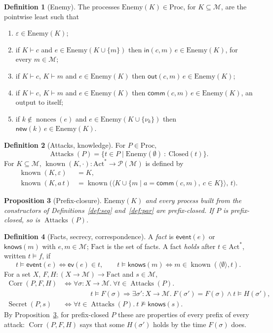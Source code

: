 \documentclass[11pt]{article}
\theoremstyle{definition}
\newtheorem{definition}{Definition}[section]
\theoremstyle{plain}
\newtheorem{proposition}[definition]{Proposition}
\theoremstyle{remark}
\newcommand{\Act}{\mathrm{Act}}
\newcommand{\Proc}{\mathrm{Proc}}
\newcommand{\known}{\operatorname{known}}
\newcommand{\Fact}{\mathrm{Fact}}
\newcommand{\Closed}{\mathrm{Closed}}
\newcommand{\nonces}{\operatorname{nonces}}
\newcommand{\Enemy}{\mathrm{Enemy}}
\newcommand{\Attacks}{\operatorname{Attacks}}
\newcommand{\Secret}{\operatorname{Secret}}
\newcommand{\Corr}{\operatorname{Corr}}
\begin{document}
\begin{definition}[Enemy]
The processes $\Enemy(K)\in\Proc$, for $K\subseteq\mathcal{M}$, are the pointwise least such that
\begin{enumerate}
\item $\varepsilon\in\Enemy(K)$;
\item if $K\vdash c$ and $e\in\Enemy(K\cup\{m\})$ then $\mathsf{in}(c,m)\,e\in\Enemy(K)$, for every $m\in\mathcal{M}$;
\item if $K\vdash c$, $K\vdash m$ and $e\in\Enemy(K)$ then $\mathsf{out}(c,m)\,e\in\Enemy(K)$;
\item if $K\vdash c$, $K\vdash m$ and $e\in\Enemy(K)$ then $\mathsf{comm}(c,m)\,e\in\Enemy(K)$, an output to itself;
\item if $k\notin\nonces(e)$ and $e\in\Enemy(K\cup\{\nu_k\})$ then $\mathsf{new}(k)\,e\in\Enemy(K)$.
\end{enumerate}
\end{definition}

\begin{definition}[Attacks, knowledge]
For $P\in\Proc$,
\[
\Attacks(P)=\{t\in P\mid\Enemy(\emptyset)\ :\ \Closed(t)\}.
\]
For $K\subseteq\mathcal{M}$, $\known(K,\cdot):\Act^*\to\mathcal{P}(\mathcal{M})$ is defined by
\begin{align*}
\known(K,\varepsilon)&=K,\\
\known(K,a\,t)&=\known\big(\langle K\cup\{m\mid a=\mathsf{comm}(c,m),\ c\in K\}\rangle,\,t\big).
\end{align*}
\end{definition}

\begin{proposition}[Prefix-closure]\label{prop:prefix}
$\Enemy(K)$ and every process built from the constructors of Definitions~\ref{def:seq} and~\ref{def:par} are prefix-closed. If $P$ is prefix-closed, so is $\Attacks(P)$.
\end{proposition}

\begin{definition}[Facts, secrecy, correspondence]
A \emph{fact} is $\mathsf{event}(e)$ or $\mathsf{knows}(m)$ with $e,m\in\mathcal{M}$; $\Fact$ is the set of facts. A fact \emph{holds} after $t\in\Act^*$, written $t\models f$, if
\[
t\models\mathsf{event}(e)\iff\mathsf{ev}(e)\in t,\qquad
t\models\mathsf{knows}(m)\iff m\in\known(\langle\emptyset\rangle,t).
\]
For a set $X$, $F,H:(X\to\mathcal{M})\to\Fact$ and $s\in\mathcal{M}$,
\begin{align*}
\Corr(P,F,H)&\iff\forall\sigma:X\to\mathcal{M}.\ \forall t\in\Attacks(P).\\
&\qquad\qquad t\models F(\sigma)\Rightarrow\exists\sigma':X\to\mathcal{M}.\ F(\sigma')=F(\sigma)\wedge t\models H(\sigma'),\\
\Secret(P,s)&\iff\forall t\in\Attacks(P).\ t\not\models\mathsf{knows}(s).
\end{align*}
By Proposition~\ref{prop:prefix}, for prefix-closed $P$ these are properties of every prefix of every attack: $\Corr(P,F,H)$ says that some $H(\sigma')$ holds by the time $F(\sigma)$ does.
\end{definition}
\end{document}
